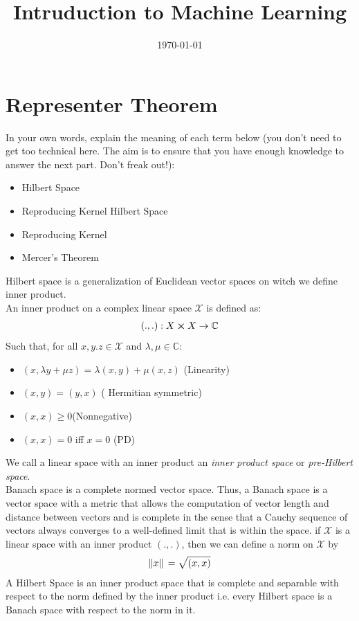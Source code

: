 \documentclass[12pt]{article}
\title{Intruduction to Machine Learning}
\date{\today}
\begin{document}
\maketitlepage
\maketitlestart

\section{Representer Theorem}
In your own words, explain the meaning of each term below (you don’t need to get too technical here. The aim is to ensure that you have enough knowledge to answer the next part. Don’t freak out!):
\begin{itemize}
    \item Hilbert Space
    \item Reproducing Kernel Hilbert Space
    \item Reproducing Kernel
    \item Mercer’s Theorem
\end{itemize}

\begin{qsolve}
    Hilbert space is a generalization of Euclidean vector spaces on witch we define inner product.
    \\ An inner product on a complex linear space $\mathcal{X}$ is defined as:
    \begin{gather*}
        (. , .) : X \cross X \rightarrow \mathbb{C}
    \end{gather*}
    Such that, for all $x,y.z \in \mathcal{X}$ and $\lambda  , \mu \in \mathbb{C}$:
    \begin{itemize}
        \item $(x,\lambda y + \mu z) = \lambda(x,y) + \mu(x,z)$ (Linearity)
        \item $(x,y) = (y,x)$ ( Hermitian symmetric)
        \item $(x,x)\geq 0$(Nonnegative)
        \item $(x,x) =0 $ iff $x=0$ (PD)
    \end{itemize}
    We call a linear space with an inner product an \textit{inner product space} or \textit{pre-Hilbert space}.
    \\Banach space is a complete normed vector space. Thus, a Banach space is a vector space with a metric that allows the computation of vector length and distance between vectors and is complete in the sense that a Cauchy sequence of vectors always converges to a well-defined limit that is within the space.
    if $\mathcal{X}$ is a linear space with an inner product $(. , .)$, then we can define a norm on $\mathcal{X}$ by
    \begin{gather*}
        \norm*{x} = \sqrt{(x,x)}
    \end{gather*}
    \splitqsolve
    A Hilbert Space is an inner product space that is complete and separable with respect to the
    norm defined by the inner product i.e. every Hilbert space is a Banach space with respect to the norm in it.
\end{qsolve}
\end{document}

